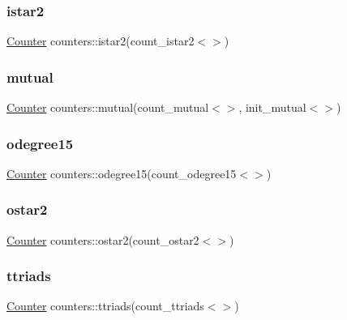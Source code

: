 \mbox{\label{namespacecounters_a9c84a53b7160d4633a71636d96c31d47}} 
\subsubsection{\texorpdfstring{istar2}{istar2}}
{\footnotesize\ttfamily \hyperlink{class_counter}{Counter} counters\+::istar2(count\+\_\+istar2$<$$>$)}

\mbox{\label{namespacecounters_adb7533c3aa1d93d0abd87222bd3ab1ec}} 
\subsubsection{\texorpdfstring{mutual}{mutual}}
{\footnotesize\ttfamily \hyperlink{class_counter}{Counter} counters\+::mutual(count\+\_\+mutual$<$$>$, init\+\_\+mutual$<$$>$)}

\mbox{\label{namespacecounters_aee8843ddc2e7cc7e2be3a645dfe99dd5}} 
\subsubsection{\texorpdfstring{odegree15}{odegree15}}
{\footnotesize\ttfamily \hyperlink{class_counter}{Counter} counters\+::odegree15(count\+\_\+odegree15$<$$>$)}

\mbox{\label{namespacecounters_a1a71c3553c8d38fb2e730bcc492eb9ae}} 
\subsubsection{\texorpdfstring{ostar2}{ostar2}}
{\footnotesize\ttfamily \hyperlink{class_counter}{Counter} counters\+::ostar2(count\+\_\+ostar2$<$$>$)}

\mbox{\label{namespacecounters_acc969e213447b929fa9f346a71a02fe5}} 
\subsubsection{\texorpdfstring{ttriads}{ttriads}}
{\footnotesize\ttfamily \hyperlink{class_counter}{Counter} counters\+::ttriads(count\+\_\+ttriads$<$$>$)}


